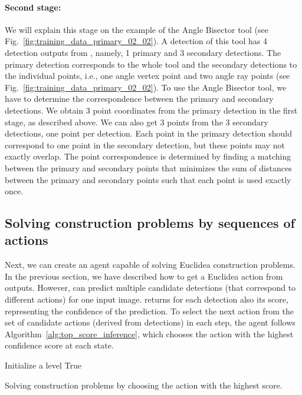 \paragraph{\textbf{Second stage:}} We will explain this stage on the example of the Angle Bisector tool (see Fig.~\ref{fig:training_data_primary_02_02}).
A detection of this tool has 4 detection outputs from \maskrcnn, namely, 1 primary and 3 secondary detections.
The primary detection corresponds to the whole tool and the secondary detections to the individual points, i.e., one angle vertex point and two angle ray points (see Fig.~\ref{fig:training_data_primary_02_02}).
To use the Angle Bisector tool, we have to determine the correspondence between the primary and secondary detections.
We obtain 3 point coordinates from the primary detection in the first stage, as described above.
We can also get 3 points from the 3 secondary detections, one point per detection.
Each point in the primary detection should correspond to one point in the secondary detection, but these points may not exactly overlap.
The point correspondence is determined by finding a matching between the primary and secondary points that minimizes the sum of distances between the primary and secondary points such that each point is used exactly once.

\subsection{Solving construction problems by sequences of actions}
\label{sec:solving_construction}
Next, we can create an agent capable of solving Euclidea construction problems.
In the previous section, we have described how to get a Euclidea action from \maskrcnn outputs.
However, \maskrcnn can predict multiple candidate detections (that correspond to different actions) for one input image.
\maskrcnn returns for each detection also its score, representing the confidence of the prediction.
To select the next action from the set of candidate actions (derived from \maskrcnn detections) in each step,
the agent follows Algorithm~\ref{alg:top_score_inference}, which chooses the action with the highest confidence score at each state.
\vspace{-6mm}
\begin{algorithm}[!htb]
\SetAlgoLined
\SetAlFnt{\small\sf}
 Initialize a level\;
 \Return True\;
\vspace{0.5mm}
\caption{\small{Solving construction problems by choosing the action with the highest score.}}
\label{alg:top_score_inference}
\end{algorithm}
\vspace{-8mm}
